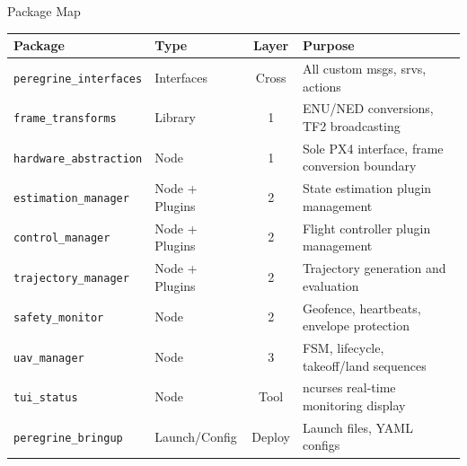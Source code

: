 \documentclass[aspectratio=169, 10pt]{beamer}
\begin{document}
\begin{frame}{Package Map}
\small
\begin{tabularx}{\textwidth}{@{}llcX@{}}
\toprule
\textbf{Package} & \textbf{Type} & \textbf{Layer} & \textbf{Purpose} \\
\midrule
\texttt{peregrine\_interfaces} & Interfaces & Cross & All custom msgs, srvs, actions \\
\texttt{frame\_transforms} & Library & 1 & ENU/NED conversions, TF2 broadcasting \\
\texttt{hardware\_abstraction} & Node & 1 & Sole PX4 interface, frame conversion boundary \\
\texttt{estimation\_manager} & Node + Plugins & 2 & State estimation plugin management \\
\texttt{control\_manager} & Node + Plugins & 2 & Flight controller plugin management \\
\texttt{trajectory\_manager} & Node + Plugins & 2 & Trajectory generation and evaluation \\
\texttt{safety\_monitor} & Node & 2 & Geofence, heartbeats, envelope protection \\
\texttt{uav\_manager} & Node & 3 & FSM, lifecycle, takeoff/land sequences \\
\texttt{tui\_status} & Node & Tool & ncurses real-time monitoring display \\
\texttt{peregrine\_bringup} & Launch/Config & Deploy & Launch files, YAML configs \\
\bottomrule
\end{tabularx}
\end{frame}
\end{document}
